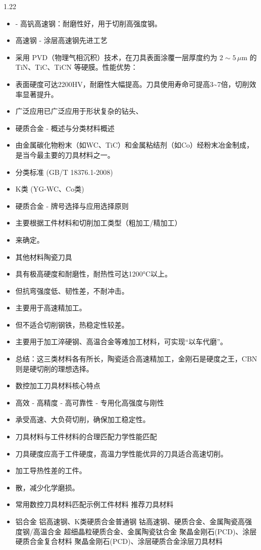 \documentclass[12pt,a4paper]{article}
\begin{document}
\begin{spacing}{1.22}
\begin{itemize}[leftmargin=2.2em,label=--]
  \item - 高钒高速钢：耐磨性好，用于切削高强度钢。
  \item 高速钢 - 涂层高速钢先进工艺
  \item 采用 PVD（物理气相沉积）技术，在刀具表面涂覆一层厚度约为 $2\sim5\,\mu\text{m}$ 的 TiN、TiC、TiCN 等硬膜。性能优势：
  \item 表面硬度可达2200HV，耐磨性大幅提高。刀具使用寿命可提高3\textasciitilde{}7倍，切削效率显著提升。
  \item 广泛应用已广泛应用于形状复杂的钻头、
  \item 硬质合金 - 概述与分类材料概述
  \item 由金属碳化物粉末（如WC、TiC）和金属粘结剂（如Co）经粉末冶金制成，是当今最主要的刀具材料之一。
  \item 分类标准 (GB/T 18376.1-2008)
  \item K类 (YG-WC、Co类)
  \item 硬质合金 - 牌号选择与应用选择原则
  \item 主要根据工件材料和切削加工类型（粗加工/精加工）
  \item 来确定。
  \item 其他材料陶瓷刀具
  \item 具有极高硬度和耐磨性，耐热性可达1200°C以上。
  \item 但抗弯强度低、韧性差，不耐冲击。
  \item 主要用于高速精加工。
  \item 但不适合切削钢铁，热稳定性较差。
  \item 主要用于加工淬硬钢、高温合金等难加工材料，可实现“以车代磨”。
  \item 总结：这三类材料各有所长，陶瓷适合高速精加工，金刚石是硬度之王，CBN则是硬切削的理想选择。
  \item 数控加工刀具材料核心特点
  \item 高效 - 高精度 - 高可靠性 - 专用化高强度与刚性
  \item 承受高速、大负荷切削，确保加工稳定性。
  \item 刀具材料与工件材料的合理匹配力学性能匹配
  \item 刀具硬度应高于工件硬度，高温力学性能优异的刀具适合高速切削。
  \item 加工导热性差的工件。
  \item 散，减少化学磨损。
  \item 常用数控刀具材料匹配示例工件材料 推荐刀具材料
  \item 铝合金 铝高速钢、K类硬质合金普通钢 钴高速钢、硬质合金、金属陶瓷高强度钢/高温合金 超细晶粒硬质合金、金属陶瓷钛合金 聚晶金刚石(PCD)、涂层硬质合金复合材料 聚晶金刚石(PCD)、涂层硬质合金涂层刀具材料

\end{itemize}
\end{spacing}
\end{document}
